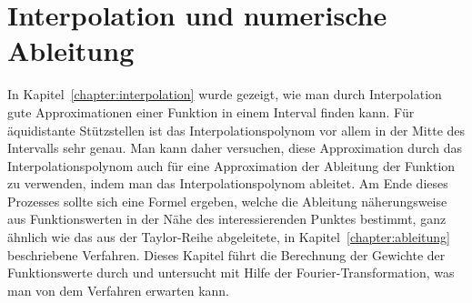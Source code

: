 %
%
%
\chapter{Interpolation und numerische Ableitung\label{chapter:interdiff}}
\rhead{}
\begin{refsection}
%
%
%
%

{\parindent0pt
In} Kapitel~\ref{chapter:interpolation} wurde gezeigt, wie man durch
Interpolation gute Approximationen einer Funktion in einem Interval
finden kann.
Für äquidistante Stützstellen ist das Interpolationspolynom vor allem in
der Mitte des Intervalls sehr genau.
Man kann daher versuchen, diese Approximation durch das Interpolationspolynom
auch für eine Approximation der Ableitung der Funktion zu verwenden, indem
man das Interpolationspolynom ableitet.
%
Am Ende dieses Prozesses sollte sich eine Formel ergeben, welche die
Ableitung näherungsweise aus Funktionswerten in der Nähe des
interessierenden Punktes bestimmt, ganz ähnlich wie das aus der
Taylor-Reihe abgeleitete, in Kapitel~\ref{chapter:ableitung} beschriebene
Verfahren.
%
Dieses Kapitel führt die Berechnung der Gewichte der Funktionswerte durch
und untersucht mit Hilfe der Fourier-Transformation, was man von dem Verfahren
erwarten kann.
%






\printbibliography[heading=subbibliography]
\end{refsection}
